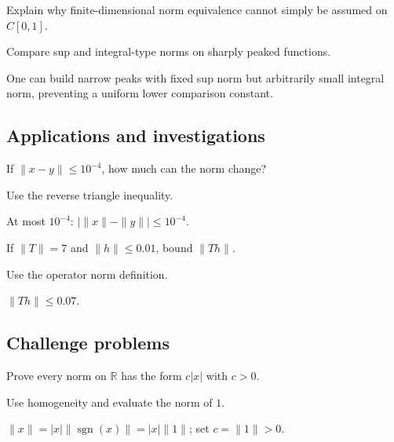 \begin{exercise}\label{exr:ii02-expand-12}
Explain why finite-dimensional norm equivalence cannot simply be assumed on \(C[0,1]\).
\end{exercise}
\begin{hint}
Compare sup and integral-type norms on sharply peaked functions.
\end{hint}
\begin{solution}
One can build narrow peaks with fixed sup norm but arbitrarily small integral norm, preventing a uniform lower comparison constant.
\end{solution}

\subsection*{Applications and investigations}

\begin{exercise}\label{exr:ii02-expand-13}
If \(\|x-y\|\le10^{-4}\), how much can the norm change?
\end{exercise}
\begin{hint}
Use the reverse triangle inequality.
\end{hint}
\begin{solution}
At most \(10^{-4}\): \(|\|x\|-\|y\||\le10^{-4}\).
\end{solution}

\begin{exercise}\label{exr:ii02-expand-14}
If \(\|T\|=7\) and \(\|h\|\le0.01\), bound \(\|Th\|\).
\end{exercise}
\begin{hint}
Use the operator norm definition.
\end{hint}
\begin{solution}
\(\|Th\|\le0.07\).
\end{solution}

\subsection*{Challenge problems}

\begin{exercise}\label{exr:ii02-expand-15}
Prove every norm on \(\mathbb R\) has the form \(c|x|\) with \(c>0\).
\end{exercise}
\begin{hint}
Use homogeneity and evaluate the norm of \(1\).
\end{hint}
\begin{solution}
\(\|x\|=|x|\|\operatorname{sgn}(x)\|=|x|\|1\|\); set \(c=\|1\|>0\).
\end{solution}

